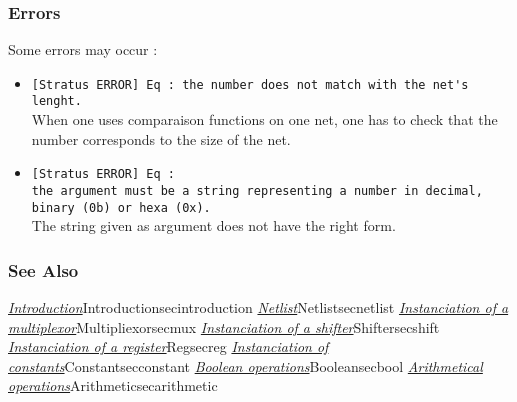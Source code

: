 \subsubsection{Errors}
    
Some errors may occur :
\begin{itemize}
    \item \verb-[Stratus ERROR] Eq : the number does not match with the net's lenght.-\\When one uses comparaison functions on one net, one has to check that the number corresponds to the size of the net.
    \item \verb-[Stratus ERROR] Eq :-\\\verb-the argument must be a string representing a number in decimal, binary (0b) or hexa (0x).-\\The string given as argument does not have the right form.
\end{itemize}

\subsubsection{See Also}

\hyperref[ref]{\emph{Introduction}}{}{Introduction}{secintroduction}
\hyperref[ref]{\emph{Netlist}}{}{Netlist}{secnetlist}
\hyperref[ref]{\emph{Instanciation of a multiplexor}}{}{Multipliexor}{secmux}
\hyperref[ref]{\emph{Instanciation of a shifter}}{Shifter}{}{secshift}
\hyperref[ref]{\emph{Instanciation of a register}}{}{Reg}{secreg}
\hyperref[ref]{\emph{Instanciation of constants}}{Constant}{}{secconstant}
\hyperref[ref]{\emph{Boolean operations}}{}{Boolean}{secbool}
\hyperref[ref]{\emph{Arithmetical operations}}{}{Arithmetic}{secarithmetic}
